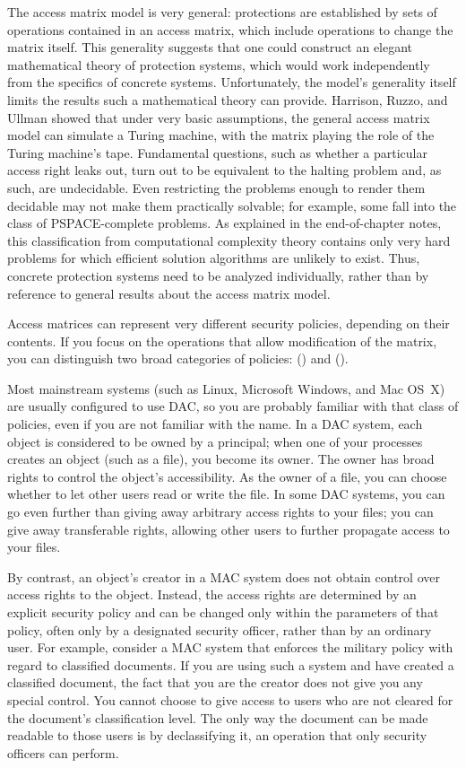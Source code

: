 The access matrix model is very general: protections are established
by sets of operations contained in an access matrix, which include
operations to change the matrix itself.  This generality suggests that
one could construct an elegant mathematical theory of protection
systems, which would work independently from the specifics of concrete
systems.  Unfortunately, the model's generality itself
limits the results such a mathematical theory can provide.  Harrison,
Ruzzo, and Ullman showed that under very basic assumptions, the
general access matrix model can simulate a Turing machine, with the
matrix playing the role of the Turing machine's tape.  Fundamental
questions, such as whether a particular access right leaks out, turn
out to be equivalent to the halting problem and, as such, are
undecidable.  Even restricting the problems enough to render them
decidable may not make them practically solvable; for example, some
fall into the class of PSPACE-complete problems.  As explained in
the end-of-chapter notes, this classification
from computational complexity theory contains only very hard
problems for which efficient solution algorithms are unlikely to
exist.
Thus, concrete protection
systems need to be analyzed individually, rather than by reference to
general results about the access matrix model.

Access matrices can represent very different security policies,
depending on their contents.  If you focus on the operations that allow
modification of the matrix, you can distinguish two broad categories of
policies:  () and
 ().

Most mainstream systems (such as Linux, Microsoft Windows, and Mac
OS~X) are usually configured to use DAC, so you are probably familiar
with that class of policies, even if you are not familiar with the name.  In a DAC
system, each object is considered to be owned by a principal; when one
of your processes creates an object (such as a file), you become its
owner.  The owner has broad rights to control the object's
accessibility.  As the owner of a file, you can choose whether to let
other users read or write the file.  In some
DAC systems, you can go even further than giving away arbitrary access rights to
your files;  you can give away transferable rights, allowing other
users to further propagate access to your files.

By contrast, an object's creator in a MAC system does not obtain
control over access rights to the object.  Instead, the access rights
are determined by an explicit security policy and can be changed only
within the parameters of that policy, often only by a designated
security officer, rather than by an ordinary user.  For example,
consider a MAC system that enforces the military policy with regard to
classified documents.  If you are using such a system and have
created a classified document, the fact that you are the creator does
not give you any special control.  You cannot choose to give access to
users who are not cleared for the document's classification level.  The only way the document
can be made readable to those users is by declassifying it, an
operation that only security officers can perform.

